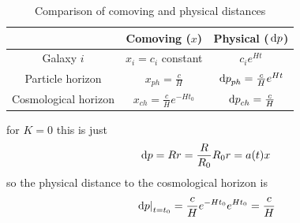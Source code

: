 \begin{table}
    \centering
    \begin{tabular}{ccc}
         & Comoving (\(x\)) & Physical (\(\dl p\))\\ \hline
        Galaxy \(i\) & \(x_i = c_i\) constant & \(c_i e^{Ht}\) \\
        Particle horizon & \(x_{ph} = \frac{c}{H}\) & \(\dl p_{ph} = \frac{c}{H} e^{Ht}\) \\
        Cosmological horizon & \(x_{ch} = \frac{c}{H} e^{-Ht_0}\) & \(\dl p_{ch} = \frac{c}{H}\)
    \end{tabular}
    \caption{Comparison of comoving and physical distances}
\end{table}
for \(K=0\) this is just
\begin{equation}
    \dl p = Rr = \frac{R}{R_0}R_0 r = a(t) x
\end{equation}
so the physical distance to the cosmological horizon is
\begin{equation}
    \left.\dl p \right\vert_{t=t_0} = \frac{c}{H} e^{-H t_0} e^{H t_0} = \frac{c}{H}
\end{equation}
